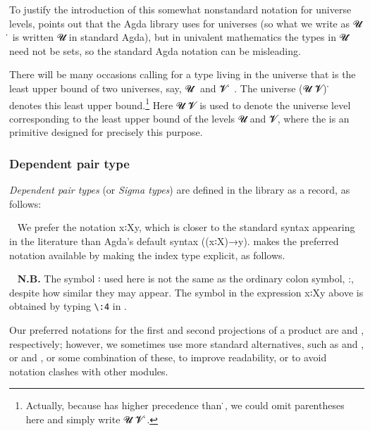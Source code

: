 To justify the introduction of this somewhat nonstandard notation for universe levels, \mhe points out that the Agda library uses  for universes (so what we write as \ab 𝓤 ̇ is written \Set{}\ab 𝓤 in standard Agda), but in univalent mathematics the types in \ab 𝓤 ̇ need not be sets, so the standard Agda notation can be misleading.

There will be many occasions calling for a type living in the universe that is the least upper bound of two universes, say, \ab 𝓤 ̇ and \ab 𝓥 ̇ . The universe (\ab 𝓤  \ab 𝓥) ̇ denotes this least upper bound.\footnote{Actually, because \AgdaUnderscore{}\AgdaUnderscore{} has higher precedence than \AgdaUnderscore{}̇, we could omit parentheses here and simply write \ab 𝓤  \ab 𝓥 ̇.} Here \ab 𝓤  \ab 𝓥 is used to denote the universe level corresponding to the least upper bound of the levels \ab 𝓤 and \ab 𝓥, where the \AgdaUnderscore{}\AgdaUnderscore{} is an \agda primitive designed for precisely this purpose.

\subsubsection{Dependent pair type}\label{dependent-pair-type}
\textit{Dependent pair types} (or \textit{Sigma types}) are defined in the \typetopology library as a record, as follows:
\ccpad

~\ccpad
We prefer the notation \ab x꞉\ab X\AgdaComma{}y, which is closer to the standard syntax appearing in the literature than Agda's default syntax ((\ab x꞉\ab X)\as →\ab y). \mhe makes the preferred notation available by making the index type explicit, as follows.
\ccpad

~\ccpad
\textbf{N.B.} The symbol ꞉ used here is not the same as the ordinary colon symbol, :, despite how similar they may appear. The symbol in the expression \ab x꞉\ab X\AgdaComma{}\ab y above is obtained by typing \texttt{\textbackslash{}:4} in \agdatwomode.

\newcommand\FstUnder{\AgdaOperator{\AgdaFunction{∣\AgdaUnderscore{}∣}}\xspace}
\newcommand\SndUnder{\AgdaOperator{\AgdaFunction{∥\AgdaUnderscore{}∥}}\xspace}
Our preferred notations for the first and second projections of a product are \FstUnder and \SndUnder, respectively; however, we sometimes use more standard alternatives, such as  and , or  and , or some combination of these, to improve readability, or to avoid notation clashes with other modules.
\ccpad


